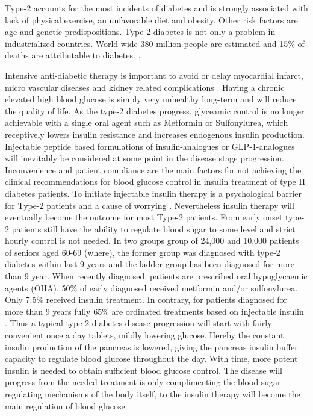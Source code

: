 Type-2 accounts for the most incidents of diabetes and is strongly associated with lack of physical exercise, an unfavorable diet and obesity. Other risk factors are age and genetic predispositions. Type-2 diabetes is not only a problem in industrialized countries.  World-wide 380 million people are estimated and 15\% of deaths are attributable to diabetes. \cite{aguiree2013idf}.

Intensive anti-diabetic therapy is important to avoid or delay myocardial infarct, micro vascular diseases and kidney related complications \cite{holman,boussageon2011effect,gaede2008effect}. Having a chronic elevated high blood glucose is simply very unhealthy long-term and will reduce the quality of life. As the type-2 diabetes progress, glyceamic control is no longer achievable with a single oral agent such as Metformin or Sulfonylurea, which receptively lowers insulin resistance and increases endogenous insulin production. Injectable peptide based formulations of insulin-analogues or GLP-1-analogues will inevitably be considered at some point in the disease stage progression. Inconvenience and patient compliance are the main factors for not achieving the clinical recommendations for blood glucose control in insulin treatment of type II diabetes patients. To initiate injectable insulin therapy is a psychological barrier for Type-2 patients and a cause of worrying \cite{korytkowski2002oral}. Nevertheless insulin therapy will eventually become the outcome for most Type-2 patients. From early onset type-2 patients still have the ability to regulate blood sugar to some level and strict hourly control is not needed. In two groups group of 24,000 and 10,000 patients of seniors aged 60-69 (where), the former group was diagnosed with type-2 diabetes within last 9 years and the ladder group has been diagnosed for more than 9 year. When recently diagnosed, patients are prescribed oral hypoglycaemic agents (OHA). 50\% of early diagnosed received metformin and/or sulfonylurea. Only 7.5\% received insulin treatment. In contrary, for patients diagnosed for more than 9 years fully 65\% are ordinated treatments based on injectable insulin \cite{Elbert2014rates}. Thus a typical type-2 diabetes disease progression will start with fairly convenient once a day tablets, mildly lowering glucose. Hereby the constant insulin production of the pancreas is lowered, giving the pancreas insulin buffer capacity to regulate blood glucose throughout the day. With time, more potent insulin is needed to obtain sufficient blood glucose control. The disease will progress from the needed treatment is only complimenting the blood sugar regulating mechanisms of the body itself, to the insulin therapy will become the main regulation of blood glucose.

